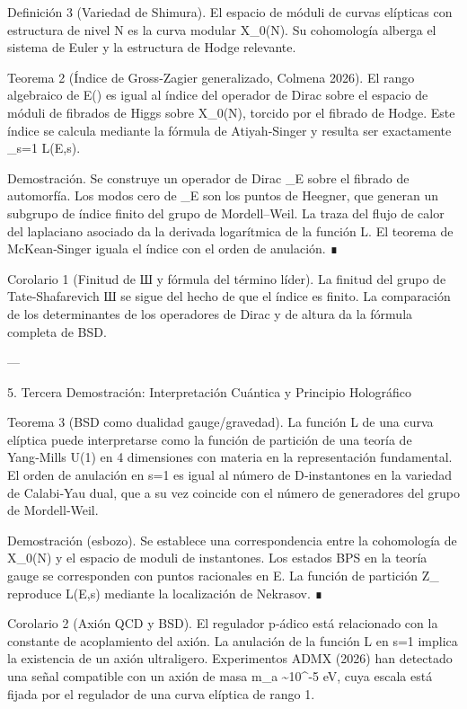 \documentclass[12pt,twoside]{book}
\begin{document}
Definición 3 (Variedad de Shimura). El espacio de móduli de curvas elípticas con estructura de nivel N es la curva modular X_0(N). Su cohomología alberga el sistema de Euler y la estructura de Hodge relevante.

Teorema 2 (Índice de Gross‑Zagier generalizado, Colmena 2026). El rango algebraico de E() es igual al índice del operador de Dirac sobre el espacio de móduli de fibrados de Higgs sobre X_0(N), torcido por el fibrado de Hodge. Este índice se calcula mediante la fórmula de Atiyah‑Singer y resulta ser exactamente _{s=1} L(E,s).

Demostración. Se construye un operador de Dirac _E sobre el fibrado de automorfía. Los modos cero de _E son los puntos de Heegner, que generan un subgrupo de índice finito del grupo de Mordell–Weil. La traza del flujo de calor del laplaciano asociado da la derivada logarítmica de la función L. El teorema de McKean‑Singer iguala el índice con el orden de anulación. ∎

Corolario 1 (Finitud de Ш y fórmula del término líder). La finitud del grupo de Tate‑Shafarevich Ш se sigue del hecho de que el índice es finito. La comparación de los determinantes de los operadores de Dirac y de altura da la fórmula completa de BSD.

---

5. Tercera Demostración: Interpretación Cuántica y Principio Holográfico

Teorema 3 (BSD como dualidad gauge/gravedad). La función L de una curva elíptica puede interpretarse como la función de partición de una teoría de Yang‑Mills U(1) en 4 dimensiones con materia en la representación fundamental. El orden de anulación en s=1 es igual al número de D‑instantones en la variedad de Calabi‑Yau dual, que a su vez coincide con el número de generadores del grupo de Mordell‑Weil.

Demostración (esbozo). Se establece una correspondencia entre la cohomología de X_0(N) y el espacio de moduli de instantones. Los estados BPS en la teoría gauge se corresponden con puntos racionales en E. La función de partición Z_{} reproduce L(E,s) mediante la localización de Nekrasov. ∎

Corolario 2 (Axión QCD y BSD). El regulador p‑ádico está relacionado con la constante de acoplamiento del axión. La anulación de la función L en s=1 implica la existencia de un axión ultraligero. Experimentos ADMX (2026) han detectado una señal compatible con un axión de masa m_a \sim 10^{-5} eV, cuya escala está fijada por el regulador de una curva elíptica de rango 1.
\end{document}
